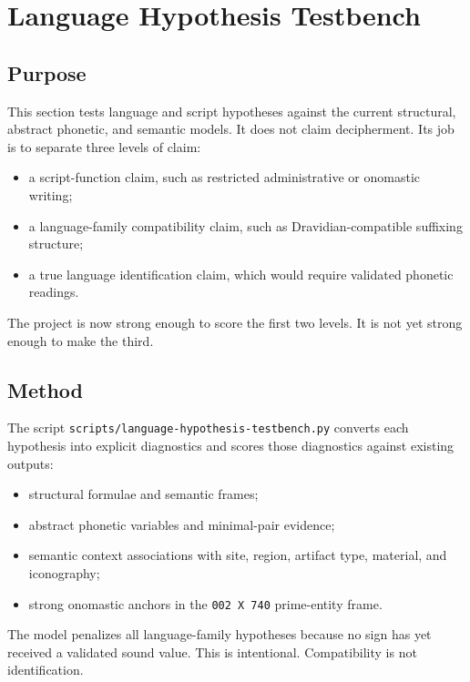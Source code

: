 \section{Language Hypothesis Testbench}

\subsection{Purpose}

This section tests language and script hypotheses against the current structural, abstract phonetic, and semantic models. It does not claim decipherment. Its job is to separate three levels of claim:

\begin{itemize}
  \item a script-function claim, such as restricted administrative or onomastic writing;
  \item a language-family compatibility claim, such as Dravidian-compatible suffixing structure;
  \item a true language identification claim, which would require validated phonetic readings.
\end{itemize}

The project is now strong enough to score the first two levels. It is not yet strong enough to make the third.

\subsection{Method}

The script \texttt{scripts/language-hypothesis-testbench.py} converts each hypothesis into explicit diagnostics and scores those diagnostics against existing outputs:

\begin{itemize}
  \item structural formulae and semantic frames;
  \item abstract phonetic variables and minimal-pair evidence;
  \item semantic context associations with site, region, artifact type, material, and iconography;
  \item strong onomastic anchors in the \texttt{002 X 740} prime-entity frame.
\end{itemize}

The model penalizes all language-family hypotheses because no sign has yet received a validated sound value. This is intentional. Compatibility is not identification.

